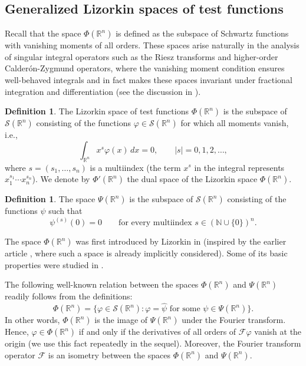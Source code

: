 \documentclass[reqno,11pt]{amsart}
\theoremstyle{definition}
\newtheorem{definition}[theorem]{Definition}
\def\R{\mathbb{R}}
\begin{document}
\subsection{Generalized Lizorkin spaces of test functions}
Recall that the space $\Phi(\mathbb{R}^n)$ is defined as the subspace of Schwartz functions with vanishing moments of all orders. These spaces arise naturally in the analysis of singular integral operators such as the Riesz transforms and higher-order Calderón-Zygmund operators, where the vanishing moment condition ensures well-behaved integrals and in fact makes these spaces invariant under fractional integration and differentiation (see the discussion in \cite[p. 146]{SKM}).
\begin{definition}
	The Lizorkin space of test functions $\Phi(\mathbb{R}^{n})$ is the subspace of $\mathcal{S}(\mathbb{R}^{n})$ consisting of the functions $\varphi\in \mathcal{S}(\mathbb{R}^{n})$ for which all moments vanish, i.e.,
	\[
	\int_{\mathbb{R}^{n}} x^s \varphi (x)\, dx=0, \qquad |s|=0,1,2,\ldots ,
	\]
	where $s=(s_1,\ldots ,s_n)$ is a multiindex (the term $x^s$ in the integral represents $x_1^{s_1} \cdots x_n^{s_n}$). We denote by $\Phi'(\mathbb{R}^n)$ the dual space of the Lizorkin space $\Phi(\mathbb{R}^n)$.
\end{definition}
\begin{definition}
	The space $\Psi(\R^n)$ is the subspace of $\mathcal{S}(\R^n)$ consisting of the functions $\psi$ such that
	\begin{equation*}
		\psi^{(s)}(0)=0\qquad \text{for every multiindex }s \in (\mathbb{N}\cup \{0\})^n.
	\end{equation*}
\end{definition}

The space $\Phi(\R^n)$ was first introduced by Lizorkin in \cite{Liz1963} (inspired by the earlier article \cite{Sem}, where such a space is already implicitly considered). Some of its basic properties were studied in \cite{Liz1963,Yos}.

The following well-known relation between the spaces $\Phi(\mathbb{R}^n)$ and $\Psi(\R^n)$ readily follows from the definitions:
\[
\Phi(\R^n) =\{ \varphi\in \mathcal{S}(\R^n): \varphi = \widehat{\psi}\text{ for some }\psi \in \Psi(\R^n)\}.
\]
In other words, $\Phi(\R^n)$ is the image of $\Psi(\R^n)$ under the Fourier transform. Hence, $\varphi \in \Phi(\mathbb{R}^n)$ if and only if the derivatives of all orders of $\mathcal{F}\varphi$  vanish at the origin (we use this fact repeatedly in the sequel). Moreover, the Fourier transform operator $\mathcal{F}$ is an isometry between the spaces $\Phi(\R^n)$ and $\Psi(\R^n)$.
\end{document}
